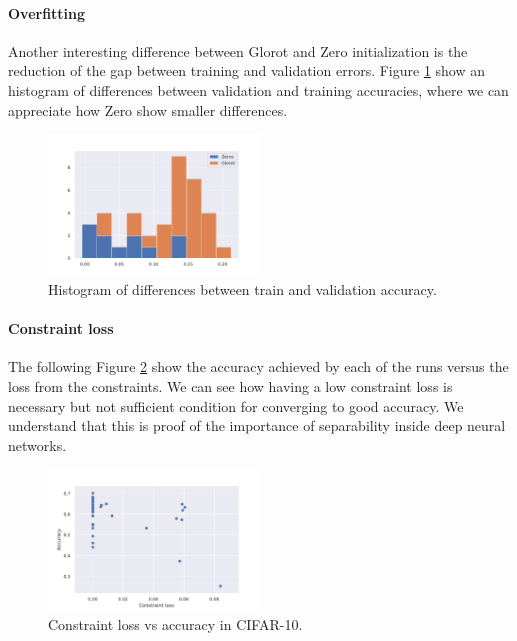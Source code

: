 \paragraph{Overfitting} Another interesting difference between Glorot and Zero initialization is the reduction of the gap between training and validation errors. Figure \ref{fig:ZeroVsGlorotDifference} show an histogram of differences between validation and training accuracies, where we can appreciate how Zero show smaller differences. 

\begin{figure}[h]\label{fig:ZeroVsGlorotDifference}
  \caption{Histogram of differences between train and validation accuracy.}
  \centering
    \includegraphics[width=0.5\textwidth]{zeros-vs-glorot-val-difference}
\end{figure}

\paragraph{Constraint loss} The following Figure \ref{fig:constraintLoss} show the accuracy achieved by each of the runs versus the loss from the constraints. We can see how having a low constraint loss is necessary but not sufficient condition for converging to good accuracy. We understand that this is proof of the importance of separability inside deep neural networks.

\begin{figure}[h]\label{fig:constraintLoss}
  \caption{Constraint loss vs accuracy in CIFAR-10.}
  \centering
    \includegraphics[width=0.5\textwidth]{constraint_loss}
\end{figure}


